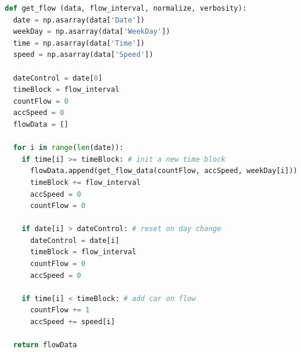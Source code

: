\begin{lstlisting}[language=Python, caption = GetFlow Python Function]
def get_flow (data, flow_interval, normalize, verbosity):
  date = np.asarray(data['Date'])
  weekDay = np.asarray(data['WeekDay'])
  time = np.asarray(data['Time'])
  speed = np.asarray(data['Speed'])
  
  dateControl = date[0]
  timeBlock = flow_interval
  countFlow = 0
  accSpeed = 0
  flowData = []

  for i in range(len(date)):
    if time[i] >= timeBlock: # init a new time block
      flowData.append(get_flow_data(countFlow, accSpeed, weekDay[i])) 
      timeBlock += flow_interval
      accSpeed = 0
      countFlow = 0
      
    if date[i] > dateControl: # reset on day change
      dateControl = date[i]
      timeBlock = flow_interval 
      countFlow = 0
      accSpeed = 0
      
    if time[i] < timeBlock: # add car on flow
      countFlow += 1
      accSpeed += speed[i]

  return flowData

\end{lstlisting}

